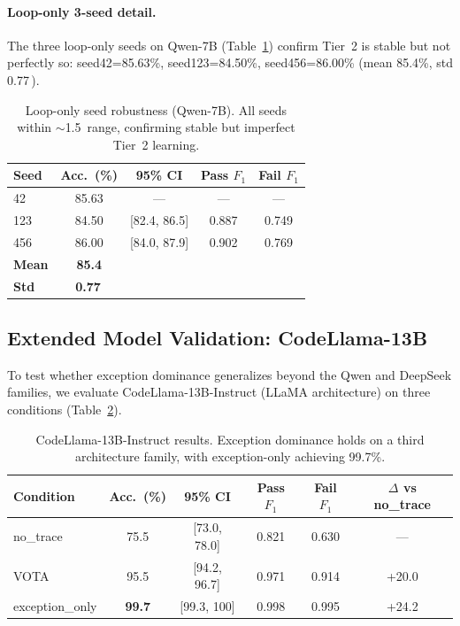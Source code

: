 \documentclass[11pt]{article}
\newcommand{\best}[1]{\textbf{\textcolor{bestcolor}{#1}}}
\newcommand{\pp}{\,\text{pp}}
\begin{document}
\paragraph{Loop-only 3-seed detail.}
The three loop-only seeds on Qwen-7B (Table~\ref{tab:loop_seeds}) confirm Tier~2 is stable but not perfectly so: seed42=85.63\%, seed123=84.50\%, seed456=86.00\% (mean 85.4\%, std 0.77\pp).

\begin{table}[t]
\centering
\small
\caption{Loop-only seed robustness (Qwen-7B). All seeds within ${\sim}$1.5\pp{} range, confirming stable but imperfect Tier~2 learning.}
\label{tab:loop_seeds}
\begin{tabular}{@{}lcccc@{}}
\toprule
\textbf{Seed} & \textbf{Acc.\ (\%)} & \textbf{95\% CI} & \textbf{Pass $F_1$} & \textbf{Fail $F_1$} \\
\midrule
42  & 85.63 & --- & --- & --- \\
123 & 84.50 & [82.4, 86.5] & 0.887 & 0.749 \\
456 & 86.00 & [84.0, 87.9] & 0.902 & 0.769 \\
\midrule
\textbf{Mean} & \textbf{85.4} & & & \\
\textbf{Std} & \textbf{0.77\pp} & & & \\
\bottomrule
\end{tabular}
\end{table}


\subsection{Extended Model Validation: CodeLlama-13B}
\label{sec:codellama}

To test whether exception dominance generalizes beyond the Qwen and DeepSeek families, we evaluate CodeLlama-13B-Instruct (LLaMA architecture) on three conditions (Table~\ref{tab:codellama}).

\begin{table}[t]
\centering
\small
\caption{CodeLlama-13B-Instruct results. Exception dominance holds on a third architecture family, with exception-only achieving 99.7\%.}
\label{tab:codellama}
\begin{tabular}{@{}lccccc@{}}
\toprule
\textbf{Condition} & \textbf{Acc.\ (\%)} & \textbf{95\% CI} & \textbf{Pass $F_1$} & \textbf{Fail $F_1$} & \textbf{$\Delta$ vs no\_trace} \\
\midrule
no\_trace        & 75.5 & [73.0, 78.0] & 0.821 & 0.630 & --- \\
VOTA             & 95.5 & [94.2, 96.7] & 0.971 & 0.914 & +20.0 \\
exception\_only  & \best{99.7} & [99.3, 100] & 0.998 & 0.995 & +24.2 \\
\bottomrule
\end{tabular}
\end{table}
\end{document}
